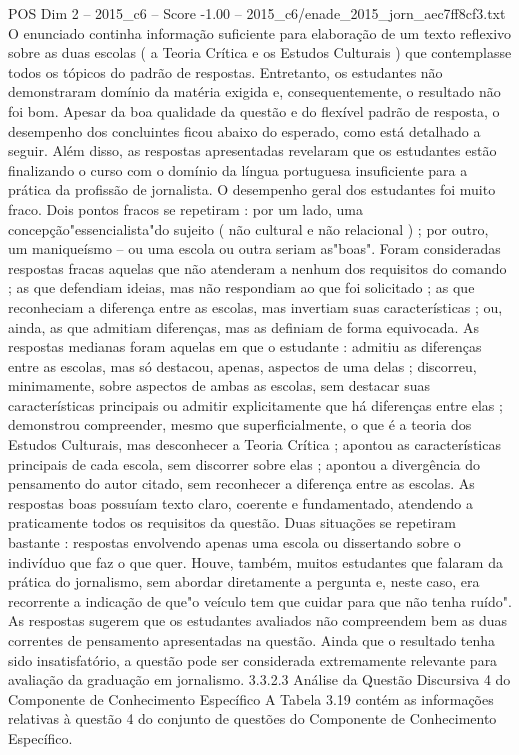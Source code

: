 \begin{textsample}{POS Dim 2 – 2015\_c6 – Score -1.00 – 2015\_c6/enade\_2015\_jorn\_aec7ff8cf3.txt}
O enunciado continha informação suficiente para elaboração de um texto reflexivo sobre as duas escolas ( a Teoria Crítica e os Estudos Culturais ) que contemplasse todos os tópicos do padrão de respostas.
Entretanto, os estudantes não demonstraram domínio da matéria exigida e, consequentemente, o resultado não foi bom.
Apesar da boa qualidade da questão e do flexível padrão de resposta, o desempenho dos concluintes ficou abaixo do esperado, como está detalhado a seguir.
Além disso, as respostas apresentadas revelaram que os estudantes estão finalizando o curso com o domínio da língua portuguesa insuficiente para a prática da profissão de jornalista.
O desempenho geral dos estudantes foi muito fraco.
Dois pontos fracos se repetiram : por um lado, uma concepção"essencialista"do sujeito ( não cultural e não relacional ) ; por outro, um maniqueísmo – ou uma escola ou outra seriam as"boas".
Foram consideradas respostas fracas aquelas que não atenderam a nenhum dos requisitos do comando ; as que defendiam ideias, mas não respondiam ao que foi solicitado ; as que reconheciam a diferença entre as escolas, mas invertiam suas características ; ou, ainda, as que admitiam diferenças, mas as definiam de forma equivocada.
As respostas medianas foram aquelas em que o estudante : admitiu as diferenças entre as escolas, mas só destacou, apenas, aspectos de uma delas ; discorreu, minimamente, sobre aspectos de ambas as escolas, sem destacar suas características principais ou admitir explicitamente que há diferenças entre elas ; demonstrou compreender, mesmo que superficialmente, o que é a teoria dos Estudos Culturais, mas desconhecer a Teoria Crítica ; apontou as características principais de cada escola, sem discorrer sobre elas ; apontou a divergência do pensamento do autor citado, sem reconhecer a diferença entre as escolas.
As respostas boas possuíam texto claro, coerente e fundamentado, atendendo a praticamente todos os requisitos da questão.
Duas situações se repetiram bastante : respostas envolvendo apenas uma escola ou dissertando sobre o indivíduo que faz o que quer.
Houve, também, muitos estudantes que falaram da prática do jornalismo, sem abordar diretamente a pergunta e, neste caso, era recorrente a indicação de que"o veículo tem que cuidar para que não tenha ruído".
As respostas sugerem que os estudantes avaliados não compreendem bem as duas correntes de pensamento apresentadas na questão.
Ainda que o resultado tenha sido insatisfatório, a questão pode ser considerada extremamente relevante para avaliação da graduação em jornalismo. 3.3.2.3 Análise da Questão Discursiva 4 do Componente de Conhecimento Específico A Tabela 3.19 contém as informações relativas à questão 4 do conjunto de questões do Componente de Conhecimento Específico.

\end{textsample}
